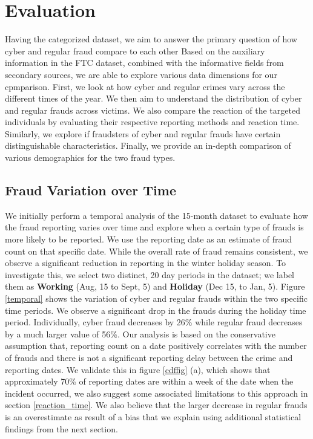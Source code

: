 \documentclass[conference]{IEEEtran}
\begin{document}
\section{Evaluation}\label{eval}

	
Having the categorized dataset, we aim to answer the primary question of how cyber and regular fraud compare to each other Based on the auxiliary information in the  FTC dataset, combined with the informative fields from secondary sources, we are able to explore various data dimensions for our cpmparison. First, we look at how cyber and regular crimes vary across the different times of the year. We then aim to understand the distribution of cyber and regular frauds across victims. We also compare the reaction of the targeted individuals by evaluating their respective reporting methods and reaction time. Similarly, we explore if fraudsters of cyber and regular frauds have certain distinguishable characteristics. Finally, we provide an in-depth comparison of various demographics for the two fraud types.


\subsection{Fraud Variation over Time}\label{var_time}



We initially perform a temporal analysis of the 15-month dataset to evaluate how the fraud reporting varies over time and explore when a certain type of frauds is more likely to be reported. We use the reporting date as an estimate of fraud count on that specific date. While the overall rate of fraud remains consistent, we observe a significant reduction in reporting in the winter holiday season. To investigate this, we select two distinct, 20 day periods in the dataset; we label them as \textbf{Working} (Aug, 15  to Sept, 5) and \textbf{Holiday} (Dec 15, to Jan, 5). Figure \ref{temporal} shows the variation of cyber and regular frauds within the two specific time periods. We observe a significant drop in the frauds during the holiday time period. Individually, cyber fraud decreases by 26\% while regular fraud decreases by a much larger value of 56\%. Our analysis is based on the conservative assumption that, reporting count on a date positively correlates with the number of frauds and there is not a significant reporting delay between the crime and reporting dates. We validate this in figure \ref{cdffig} (a), which shows that approximately 70\% of reporting dates are within a week of the date when the incident occurred, we also suggest some associated limitations to this approach in section \ref{reaction_time}. We also believe that the larger decrease in regular frauds is an overestimate as result of a bias that we explain using additional statistical findings from the next section.
\end{document}
